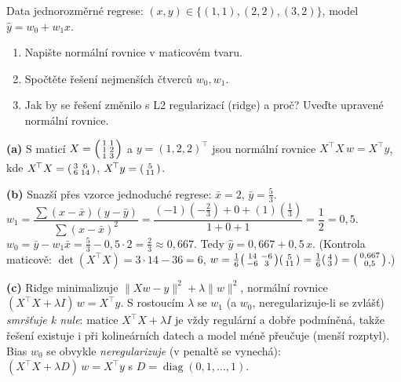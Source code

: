 \begin{zadani}
Data jednorozměrné regrese: $(x,y)\in\{(1,1),(2,2),(3,2)\}$, model $\hat y=w_0+w_1x$.
\begin{enumerate}[label=(\alph*)]
  \item {} Napište normální rovnice v maticovém tvaru.
  \item {} Spočtěte řešení nejmenších čtverců $w_0,w_1$.
  \item {} Jak by se řešení změnilo s L2 regularizací (ridge) a proč? Uveďte upravené normální rovnice.
\end{enumerate}
\end{zadani}

\begin{reseni}
\textbf{(a)} S maticí $X=\begin{psmallmatrix}1&1\\1&2\\1&3\end{psmallmatrix}$ a $y=(1,2,2)^{\!\top}$ jsou normální rovnice $X^{\!\top}X\,w=X^{\!\top}y$, kde
$X^{\!\top}X=\begin{psmallmatrix}3&6\\6&14\end{psmallmatrix}$, $X^{\!\top}y=\begin{psmallmatrix}5\\11\end{psmallmatrix}$.

\textbf{(b)} Snazší přes vzorce jednoduché regrese: $\bar x=2$, $\bar y=\tfrac53$.
$w_1=\dfrac{\sum(x-\bar x)(y-\bar y)}{\sum(x-\bar x)^2}=\dfrac{(-1)(-\tfrac23)+0+(1)(\tfrac13)}{1+0+1}=\dfrac{1}{2}=0{,}5$.
$w_0=\bar y-w_1\bar x=\tfrac53-0{,}5\cdot2=\tfrac23\approx0{,}667$. Tedy $\hat y=0{,}667+0{,}5\,x$.
(Kontrola maticově: $\det(X^{\!\top}X)=3\cdot14-36=6$, $w=\tfrac16\begin{psmallmatrix}14&-6\\-6&3\end{psmallmatrix}\begin{psmallmatrix}5\\11\end{psmallmatrix}=\tfrac16\begin{psmallmatrix}4\\3\end{psmallmatrix}=\begin{psmallmatrix}0{,}667\\0{,}5\end{psmallmatrix}$.)

\textbf{(c)} Ridge minimalizuje $\lVert Xw-y\rVert^2+\lambda\lVert w\rVert^2$, normální rovnice $(X^{\!\top}X+\lambda I)\,w=X^{\!\top}y$. S rostoucím $\lambda$ se $w_1$ (a $w_0$, neregularizuje-li se zvlášť) \emph{smršťuje k nule}: matice $X^{\!\top}X+\lambda I$ je vždy regulární a dobře podmíněná, takže řešení existuje i při kolineárních datech a model méně přeučuje (menší rozptyl). Bias $w_0$ se obvykle \emph{neregularizuje} (v penaltě se vynechá): $(X^{\!\top}X+\lambda D)\,w=X^{\!\top}y$ s $D=\operatorname{diag}(0,1,\dots,1)$.
\end{reseni}

